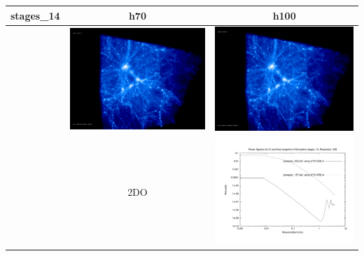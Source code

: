 \documentclass[a4paper,11pt,fleqn,oneside]{book}
\begin{document}
\begin{itemize}
\begin{table}[p]
\centering
\begin{tabular}{l|c|c}
stages\_14 & h70 & h100 \\
\hline 
 & \includegraphics[scale=0.075]{r256/h100/stages_14/197.jpg} & \includegraphics[scale=0.075]{r256/h100/stages_14/197.jpg} \\
 & 2DO & \includegraphics[scale=0.25]{r256/h100/stages_14/plot_powspec_stages_14.pdf} \\

\end{tabular}
\end{table}
\end{itemize}
\end{document}
